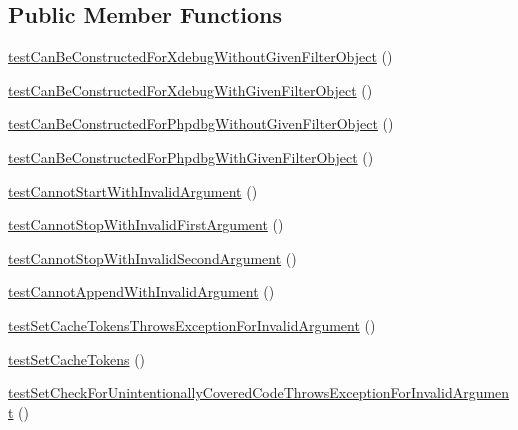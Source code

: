 \subsection*{Public Member Functions}
\begin{DoxyCompactItemize}
\item 
\mbox{\hyperlink{class_sebastian_bergmann_1_1_code_coverage_1_1_code_coverage_test_a2ef8e93a85ef7574a1735ebd657dea43}{test\+Can\+Be\+Constructed\+For\+Xdebug\+Without\+Given\+Filter\+Object}} ()
\item 
\mbox{\hyperlink{class_sebastian_bergmann_1_1_code_coverage_1_1_code_coverage_test_aa32640092470ad3a8822f81270188d2e}{test\+Can\+Be\+Constructed\+For\+Xdebug\+With\+Given\+Filter\+Object}} ()
\item 
\mbox{\hyperlink{class_sebastian_bergmann_1_1_code_coverage_1_1_code_coverage_test_a25574c981d8b9cae205a9af11d7f4a9d}{test\+Can\+Be\+Constructed\+For\+Phpdbg\+Without\+Given\+Filter\+Object}} ()
\item 
\mbox{\hyperlink{class_sebastian_bergmann_1_1_code_coverage_1_1_code_coverage_test_a0a2b940f617e63dd40d4a03dfc063025}{test\+Can\+Be\+Constructed\+For\+Phpdbg\+With\+Given\+Filter\+Object}} ()
\item 
\mbox{\hyperlink{class_sebastian_bergmann_1_1_code_coverage_1_1_code_coverage_test_a1f789bb9ee0928bfb135275aa242efcb}{test\+Cannot\+Start\+With\+Invalid\+Argument}} ()
\item 
\mbox{\hyperlink{class_sebastian_bergmann_1_1_code_coverage_1_1_code_coverage_test_ad776385197bd7cd4e71d87a5253cdb79}{test\+Cannot\+Stop\+With\+Invalid\+First\+Argument}} ()
\item 
\mbox{\hyperlink{class_sebastian_bergmann_1_1_code_coverage_1_1_code_coverage_test_adc93f031b830ade444006462b646941d}{test\+Cannot\+Stop\+With\+Invalid\+Second\+Argument}} ()
\item 
\mbox{\hyperlink{class_sebastian_bergmann_1_1_code_coverage_1_1_code_coverage_test_a453eb52ab13bc87af38c82e1c59515a8}{test\+Cannot\+Append\+With\+Invalid\+Argument}} ()
\item 
\mbox{\hyperlink{class_sebastian_bergmann_1_1_code_coverage_1_1_code_coverage_test_a29956f5faed95f63493ad79d7f3acc43}{test\+Set\+Cache\+Tokens\+Throws\+Exception\+For\+Invalid\+Argument}} ()
\item 
\mbox{\hyperlink{class_sebastian_bergmann_1_1_code_coverage_1_1_code_coverage_test_a9413b7be9bb512ef8c059bf849d745a2}{test\+Set\+Cache\+Tokens}} ()
\item 
\mbox{\hyperlink{class_sebastian_bergmann_1_1_code_coverage_1_1_code_coverage_test_ae01dc57ba89fbc0905751509bb674f43}{test\+Set\+Check\+For\+Unintentionally\+Covered\+Code\+Throws\+Exception\+For\+Invalid\+Argument}} ()

\end{DoxyCompactItemize}
